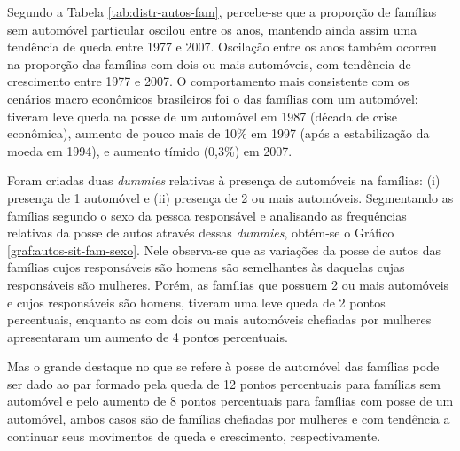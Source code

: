Segundo a Tabela \ref{tab:distr-autos-fam}, percebe-se que a proporção de famílias sem automóvel particular oscilou entre os anos, mantendo ainda assim uma tendência de queda entre 1977 e 2007. Oscilação entre os anos também ocorreu na proporção das famílias com dois ou mais automóveis, com tendência de crescimento entre 1977 e 2007. O comportamento mais consistente com os cenários macro econômicos brasileiros foi o das famílias com um automóvel: tiveram leve queda na posse de um automóvel em 1987 (década de crise econômica), aumento de pouco mais de 10\% em 1997 (após a estabilização da moeda em 1994), e aumento tímido (0,3\%) em 2007.

Foram criadas duas \textit{dummies} relativas à presença de automóveis na famílias: (i) presença de 1 automóvel e (ii) presença de 2 ou mais automóveis.
Segmentando as famílias segundo o sexo da pessoa responsável e analisando as frequências relativas da posse de autos através dessas \textit{dummies}, obtém-se o Gráfico \ref{graf:autos-sit-fam-sexo}. Nele observa-se que as variações da posse de autos das famílias cujos responsáveis são homens são semelhantes às daquelas cujas responsáveis são mulheres. Porém, as famílias que possuem 2 ou mais automóveis e cujos responsáveis são homens, tiveram uma leve queda de 2 pontos percentuais, enquanto as com dois ou mais automóveis chefiadas por mulheres apresentaram um aumento de 4 pontos percentuais.

Mas o grande destaque no que se refere à posse de automóvel das famílias pode ser dado ao par formado pela queda de 12 pontos percentuais para famílias sem automóvel e pelo aumento de 8 pontos percentuais para famílias com posse de um automóvel, ambos casos são de famílias chefiadas por mulheres e com tendência a continuar seus movimentos de queda e crescimento, respectivamente.

